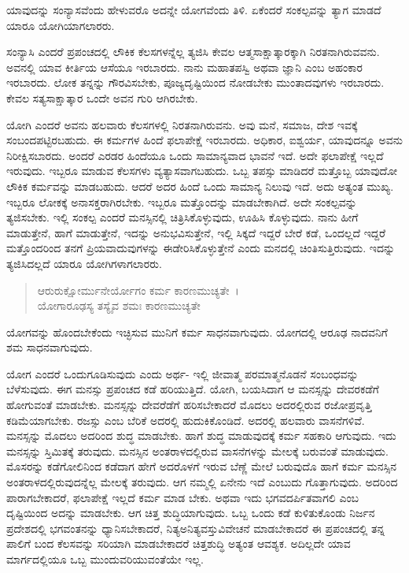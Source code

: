 {\small ಯಾವುದನ್ನು ಸಂನ್ಯಾಸವೆಂದು ಹೇಳುವರೊ ಅದನ್ನೇ ಯೋಗವೆಂದು ತಿಳಿ. ಏಕೆಂದರೆ ಸಂಕಲ್ಪವನ್ನು ತ್ಯಾಗ ಮಾಡದೆ ಯಾರೂ ಯೋಗಿಯಾಗಲಾರರು.}

ಸಂನ್ಯಾಸಿ ಎಂದರೆ ಪ್ರಪಂಚದಲ್ಲಿ ಲೌಕಿಕ ಕೆಲಸಗಳನ್ನೆಲ್ಲ ತ್ಯಜಿಸಿ ಕೇವಲ ಆತ್ಮಸಾಕ್ಷಾತ್ಕಾರಕ್ಕಾಗಿ ನಿರತನಾಗಿರುವವನು. ಅವನಲ್ಲಿ ಯಾವ ಕೀರ್ತಿಯ ಆಸೆಯೂ ಇರಬಾರದು. ನಾನು ಮಹಾತಪಸ್ವಿ ಅಥವಾ ಜ್ಞಾನಿ ಎಂಬ ಅಹಂಕಾರ ಇರಬಾರದು. ಲೋಕ ತನ್ನನ್ನು ಗೌರವಿಸಬೇಕು, ಪೂಜ್ಯದೃಷ್ಟಿಯಿಂದ ನೋಡಬೇಕು ಮುಂತಾದವುಗಳು ಇರಬಾರದು. ಕೇವಲ ಸತ್ಯಸಾಕ್ಷಾತ್ಕಾರ ಒಂದೇ ಅವನ ಗುರಿ ಆಗಿರಬೇಕು.

ಯೋಗಿ ಎಂದರೆ ಅವನು ಹಲವಾರು ಕೆಲಸಗಳಲ್ಲಿ ನಿರತನಾಗಿರುವನು. ಅವು ಮನೆ, ಸಮಾಜ, ದೇಶ ಇವಕ್ಕೆ ಸಂಬಂದಪಟ್ಟಿರಬಹುದು. ಈ ಕರ್ಮಗಳ ಹಿಂದೆ ಫಲಾಪೇಕ್ಷೆ ಇರಬಾರದು. ಅಧಿಕಾರ, ಐಶ್ವರ್ಯ, ಯಾವುದನ್ನೂ ಅವನು ನಿರೀಕ್ಷಿಸಬಾರದು. ಅಂದರೆ ಎರಡರ ಹಿಂದೆಯೂ ಒಂದು ಸಾಮಾನ್ಯವಾದ ಭಾವನೆ ಇದೆ. ಅದೇ ಫಲಾಪೇಕ್ಷೆ ಇಲ್ಲದೆ ಇರುವುದು. ಇಬ್ಬರೂ ಮಾಡುವ ಕೆಲಸಗಳು ವ್ಯತ್ಯಾಸವಾಗಬಹುದು. ಒಬ್ಬ ತಪಸ್ಸು ಮಾಡಿದರೆ ಮತ್ತೊಬ್ಬ ಯಾವುದೋ ಲೌಕಿಕ ಕರ್ಮವನ್ನು ಮಾಡಬಹುದು. ಆದರೆ ಅದರ ಹಿಂದೆ ಒಂದು ಸಾಮಾನ್ಯ ನಿಲುವು ಇದೆ. ಅದು ಅತ್ಯಂತ ಮುಖ್ಯ. ಇಬ್ಬರೂ ಲೋಕಕ್ಕೆ ಅನಾಸಕ್ತರಾಗಿರಬೇಕು. ಇಬ್ಬರೂ ಮತ್ತೊಂದನ್ನು ಮಾಡಬೇಕಾಗಿದೆ. ಅದೇ ಸಂಕಲ್ಪವನ್ನು ತ್ಯಜಿಸಬೇಕು. ಇಲ್ಲಿ ಸಂಕಲ್ಪ ಎಂದರೆ ಮನಸ್ಸಿನಲ್ಲಿ ಚಿತ್ರಿಸಿಕೊಳ್ಳುವುದು, ಊಹಿಸಿ ಕೊಳ್ಳುವುದು. ನಾನು ಹೀಗೆ ಮಾಡುತ್ತೇನೆ, ಹಾಗೆ ಮಾಡುತ್ತೇನೆ, ಇದನ್ನು ಅನುಭವಿಸುತ್ತೇನೆ, ಇಲ್ಲಿ ಸಿಕ್ಕದೆ ಇದ್ದರೆ ಬೇರೆ ಕಡೆ, ಒಂದಲ್ಲದೆ ಇದ್ದರೆ ಮತ್ತೊಂದರಿಂದ ತನಗೆ ಪ್ರಿಯವಾದುವುಗಳನ್ನು ಈಡೇರಿಸಿಕೊಳ್ಳುತ್ತೇನೆ ಎಂದು ಮನದಲ್ಲಿ ಚಿಂತಿಸುತ್ತಿರುವುದು. ಇದನ್ನು ತ್ಯಜಿಸಿದಲ್ಲದೆ ಯಾರೂ ಯೋಗಿಗಳಾಗಲಾರರು.

\begin{verse}
ಆರುರುಕ್ಷೋರ್ಮುನೇರ್ಯೋಗಂ ಕರ್ಮ ಕಾರಣಮುಚ್ಯತೇ~।\\ಯೋಗಾರೂಢಸ್ಯ ತಸ್ಯೈವ ಶಮಃ ಕಾರಣಮುಚ್ಯತೇ 
\end{verse}

{\small ಯೋಗವನ್ನು ಹೊಂದಬೇಕೆಂದು ಇಚ್ಛಿಸುವ ಮುನಿಗೆ ಕರ್ಮ ಸಾಧನವಾಗುವುದು. ಯೋಗದಲ್ಲಿ ಆರೂಢ ನಾದವನಿಗೆ ಶಮ ಸಾಧನವಾಗುವುದು.}

ಯೋಗ ಎಂದರೆ ಒಂದುಗೂಡಿಸುವುದು ಎಂದು ಅರ್ಥ- ಇಲ್ಲಿ ಜೀವಾತ್ಮ ಪರಮಾತ್ಮನೊಡನೆ ಸಂಬಂಧವನ್ನು ಬೆಳೆಸುವುದು. ಈಗ ಮನಸ್ಸು ಪ್ರಪಂಚದ ಕಡೆ ಹರಿಯುತ್ತಿದೆ. ಯೋಗಿ, ಬಯಸಿದಾಗ ಆ ಮನಸ್ಸನ್ನು ದೇವರಕಡೆಗೆ ಹೋಗುವಂತೆ ಮಾಡಬೇಕು. ಮನಸ್ಸನ್ನು ದೇವರೆಡೆಗೆ ಹರಿಸಬೇಕಾದರೆ ಮೊದಲು ಅದರಲ್ಲಿರುವ ರಜೋಪ್ರವೃತ್ತಿ ಕಡಿಮೆಯಾಗಬೇಕು. ರಜಸ್ಸು ಎಂಬ ಬೆರಿಕೆ ಅದರಲ್ಲಿ ಹುದುಕಿಕೊಂಡಿದೆ. ಅದರಲ್ಲಿ ಹಲವಾರು ವಾಸನೆಗಳಿವೆ. ಮನಸ್ಸನ್ನು ಮೊದಲು ಅದರಿಂದ ಶುದ್ಧ ಮಾಡಬೇಕು. ಹಾಗೆ ಶುದ್ಧ ಮಾಡುವುದಕ್ಕೆ ಕರ್ಮ ಸಹಕಾರಿ ಆಗುವುದು. ಇದು ಮನಸ್ಸನ್ನು ಸ್ತಿಮಿತಕ್ಕೆ ತರುವುದು. ಮನಸ್ಸಿನ ಅಂತರಾಳದಲ್ಲಿರುವ ವಾಸನೆಗಳನ್ನು ಮೇಲಕ್ಕೆ ಬರುವಂತೆ ಮಾಡುವುದು. ಮೊಸರನ್ನು ಕಡೆಗೋಲಿನಿಂದ ಕಡೆದಾಗ ಹೇಗೆ ಅದರೊಳಗೆ ಇರುವ ಬೆಣ್ಣೆ ಮೇಲೆ ಬರುವುದೊ ಹಾಗೆ ಕರ್ಮ ಮನಸ್ಸಿನ ಅಂತರಾಳದಲ್ಲಿರುವುದನ್ನೆಲ್ಲ ಮೇಲಕ್ಕೆ ತರುವುದು. ಆಗ ನಮ್ಮಲ್ಲಿ ಏನೇನು ಇದೆ ಎಂಬುದು ಗೊತ್ತಾಗುವುದು. ಅದರಿಂದ ಪಾರಾಗಬೇಕಾದರೆ, ಫಲಾಪೇಕ್ಷೆ ಇಲ್ಲದೆ ಕರ್ಮ ಮಾಡ ಬೇಕು. ಅಥವಾ ಇದು ಭಗವದರ್ಪಿತವಾಗಲಿ ಎಂಬ ದೃಷ್ಟಿಯಿಂದ ಅದನ್ನು ಮಾಡಬೇಕು. ಆಗ ಚಿತ್ತ ಶುದ್ಧಿಯಾಗುವುದು. ಒಬ್ಬ ಒಂದು ಕಡೆ ಕುಳಿತುಕೊಂಡು ನಿರ್ಜನ ಪ್ರದೇಶದಲ್ಲಿ ಭಗವಂತನನ್ನು ಧ್ಯಾನಿಸಬೇಕಾದರೆ, ನಿತ್ಯಅನಿತ್ಯವಸ್ತುವಿವೇಚನೆ ಮಾಡಬೇಕಾದರೆ ಈ ಪ್ರಪಂಚದಲ್ಲಿ ತನ್ನ ಪಾಲಿಗೆ ಬಂದ ಕೆಲಸವನ್ನು ಸರಿಯಾಗಿ ಮಾಡಬೇಕಾದರೆ ಚಿತ್ತಶುದ್ಧಿ ಅತ್ಯಂತ ಆವಶ್ಯಕ. ಅದಿಲ್ಲದೇ ಯಾವ ಮಾರ್ಗದಲ್ಲಿಯೂ ಒಬ್ಬ ಮುಂದುವರಿಯುವಂತೆಯೇ ಇಲ್ಲ.

